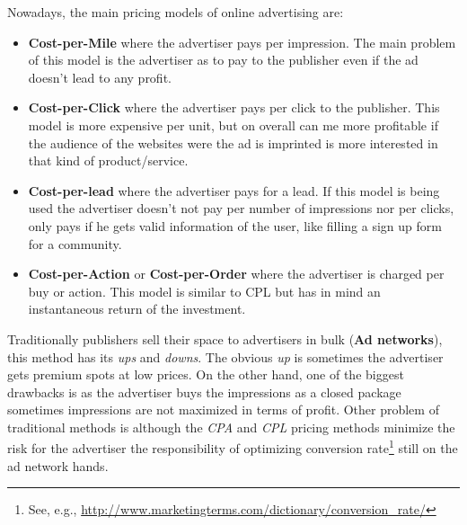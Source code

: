 Nowadays, the main pricing models of online advertising are:
\begin{itemize}
\item\textbf{Cost-per-Mile} where the advertiser pays per impression. The main problem of this model is the advertiser as to pay to the publisher even
if the ad doesn't lead to any profit.
\item\textbf{Cost-per-Click} where the advertiser pays per click to the publisher. This model is more expensive per unit\cite{Performics}, but on overall can me more
profitable\cite{Performics} if the audience of the websites were the ad is imprinted is more interested in that kind of product/service\cite{Andrea2004}.
\item\textbf{Cost-per-lead} where the advertiser pays for a lead. If this model is being used the advertiser doesn't not pay per number of impressions nor per clicks,
only pays if he gets valid information of the user, like filling a sign up form for a community.
\item\textbf{Cost-per-Action} or \textbf{Cost-per-Order} where the advertiser is charged per buy or action. This model is similar to CPL but has in mind an instantaneous return of
the investment.
\end{itemize}

Traditionally publishers sell their space to advertisers in bulk (\textbf{Ad networks}), this method has its \textit{ups} and \textit{downs}.
The obvious \textit{up} is sometimes the advertiser gets premium spots at low prices.
On the other hand, one of the biggest drawbacks is as the advertiser buys the impressions as a
closed package sometimes impressions are not maximized in terms of profit.
Other problem of traditional methods is although the \emph{CPA} and \emph{CPL} pricing methods minimize the risk for the advertiser the responsibility of
optimizing conversion rate\footnote{See, e.g., \url{http://www.marketingterms.com/dictionary/conversion_rate/}} still
on the ad network hands.\cite{Yuan:2013:RBO:2501040.2501980}

